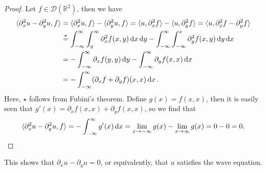 \documentclass{article}
\theoremstyle{plain}
\theoremstyle{remark}
\newcommand{\Bb}{\mathbb}
\newcommand{\Cal}{\mathcal}
\newcommand{\RR}{\Bb R}
\newcommand{\DD}{\Cal D}
\DeclarePairedDelimiter{\ang}{\langle}{\rangle}
\newcommand\pt\partial
\begin{document}
\begin{proof}
	Let $f \in \DD(\RR^2)$, then we have
	\begin{align*}
		\ang{\pt_x^2 u - \pt_y^2 u, f} &= \ang{\pt_x^2 u, f}- \ang{\pt_y^2 u, f} = \ang{u, \pt_x^2 f} - \ang{u, \pt_y^2 f} = \ang{u, \pt_x^2 f - \pt_y^2 f} \\
		&\overset\star= \int_{-\infty}^\infty \int_{y}^\infty \pt_x^2 f(x, y) \dd{x}\dd{y} - \int_{-\infty}^\infty \int_{-\infty}^x \pt_y^2 f(x, y) \dd{y} \dd{x} \\
		&= - \int_{-\infty}^\infty \pt_x f(y, y) \dd{y} - \int_{-\infty}^\infty \pt_y f(x, x) \dd{x}
		\\
		&= - \int_{-\infty}^\infty (\pt_xf + \pt_yf)(x, x) \dd{x}.
	\end{align*}
Here, $\star$ follows from Fubini's theorem. 
Define $g(x) = f(x, x)$, then it is easily seen that $g'(x) = \pt_x f(x, x) + \pt_y f(x, x)$, so we find that
\[
\ang{\pt_x^2 u - \pt_y^2 u, f} = 
- \int_{-\infty}^\infty g'(x) \dd{x} = \lim_{x\to -\infty} g(x) - \lim_{x\to\infty} g(x) = 0 - 0 = 0. 
\]
\end{proof}

This shows that $\pt_x u - \pt_y u = 0$, or equivalently, that $u$ satisfies the wave equation. 
\end{document}
